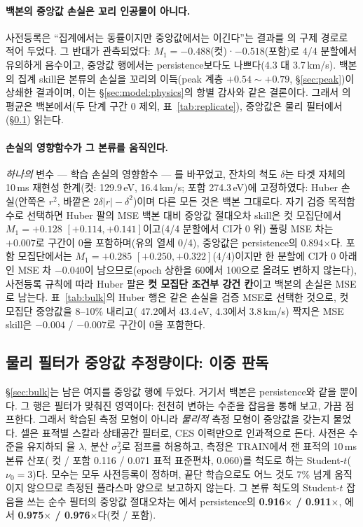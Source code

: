 \documentclass[10pt,a4paper]{article}
\begin{document}
\paragraph{백본의 \Vrot{} 중앙값 손실은 꼬리 인공물이 아니다.} 사전등록은 ``집계에서는
동률이지만 중앙값에서는 이긴다''는 결과를 \Vrot{}의 구제 경로로 적어 두었다. 그
반대가 관측되었다: $M_1 = -0.488$(컷)·$-0.518$(포함)로 4/4 분할에서 유의하게
음수이고, 중앙값 행에서는 persistence보다도 나쁘다(4.3 대 3.7\,km/s). 백본의
집계 skill은 본류의 손실을 꼬리의 이득(peak 계층 $+0.54\sim+0.79$,
\S\ref{sec:peak})이 상쇄한 결과이며, 이는 \S\ref{sec:model:physics}의 항별 감사와 같은 결론이다.
그래서 \Vrot{}의 평균은 백본에서(두 단계 구간 0 제외, 표~\ref{tab:replicate}),
중앙값은 물리 필터에서(\S\ref{sec:physfilter}) 읽는다.

\paragraph{손실의 영향함수가 그 본류를 움직인다.} \emph{하나의} 변수 --- 학습 손실의
영향함수 --- 를 바꾸었고, 잔차의 척도 $\delta$는 타겟 자체의 10\,ms 재현성 한계(컷:
\Ti{} 129.9\,eV, \Vrot{} 16.4\,km/s; 포함 274.3\,eV)에 고정하였다: Huber 손실(안쪽은
$r^2$, 바깥은 $2\delta|r|-\delta^2$)이며 다른 모든 것은 백본 그대로다. 자기 검증
목적함수로 선택하면 Huber 팔의 MSE 백본 대비 \Ti{} 중앙값 절대오차 skill은 컷
모집단에서 $M_1 = +0.128$ $[+0.114, +0.141]$이고(4/4 분할에서 CI가 0 위) 풀링 MSE
차는 $+0.007$로 구간이 0을 포함하며(유의 열세 0/4), \Ti{} 중앙값은 persistence의
0.894$\times$다. 포함 모집단에서는 $M_1 = +0.285$ $[+0.250, +0.322]$(4/4)이지만 한
분할에 CI가 0 아래인 \Ti{} MSE 차 $-0.040$이 남으므로(epoch 상한을 60에서 100으로
올려도 변하지 않는다), 사전등록 규칙에 따라 Huber 팔은 \textbf{컷 모집단 조건부 강건
칸}이고 백본의 손실은 MSE로 남는다. 표~\ref{tab:bulk}의 Huber 행은 같은 손실을 검증
MSE로 선택한 것으로, 컷 모집단 중앙값을 8--10\% 내리고(\Ti{} 47.2에서 43.4\,eV,
\Vrot{} 4.3에서 3.8\,km/s) 짝지은 MSE skill은 $-0.004$ / $-0.007$로 구간이 0을
포함한다.

\subsection{물리 필터가 중앙값 추정량이다: 이중 판독}
\label{sec:physfilter}

\S\ref{sec:bulk}는 남은 여지를 중앙값 행에 두었다. 거기서 백본은 persistence와
같을 뿐이다. 그 행은 필터가 맞춰진 영역이다: 천천히 변하는 수준을 잡음을 통해 보고,
가끔 점프한다. 그래서 학습된 측정 모형이 아니라 \emph{물리적} 측정 모형이 중앙값을
갖는지 물었다. 셀은 표적별 스칼라 상태공간 필터로, CES 이력만으로 인과적으로
돈다. 사전은 수준을 유지하되 율 $\lambda$, 분산 $\sigma_J^2$로 점프를 허용하고,
측정은 TRAIN에서 잰 표적의 10\,ms 본류 산포(\Ti{} 컷 / 포함 0.116 / 0.071 표적
표준편차, \Vrot{} 0.060)를 척도로 하는 Student-$t$($\nu_0 = 3$)다. 모수는 모두
사전등록이 정하며, 끝단 학습으로도 어느 것도 7\% 넘게 움직이지 않으므로 측정된
플라스마 양으로 보고하지 않는다.
그 본류 척도의 Student-$t$ 잡음을 쓰는 순수 필터의 중앙값 절대오차는 \Ti{}에서
persistence의 \textbf{0.916$\times$ / 0.911$\times$}, \Vrot{}에서
\textbf{0.975$\times$ / 0.976$\times$}다(컷 / 포함).
\end{document}
